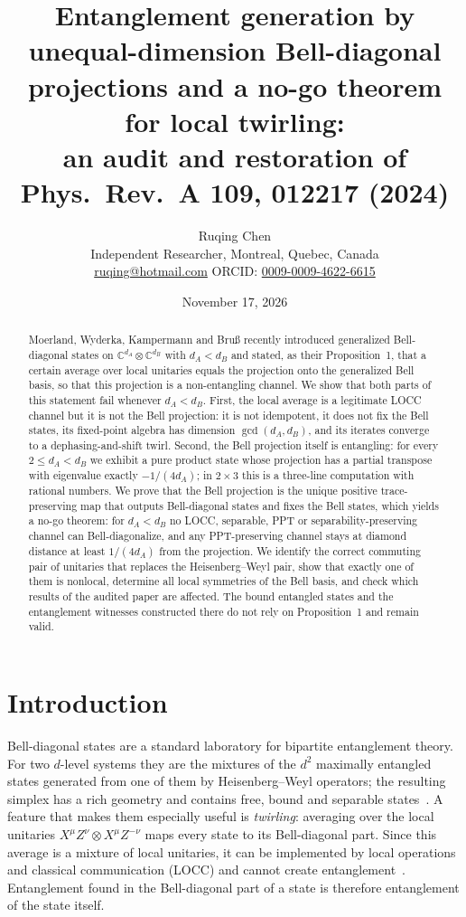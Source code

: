 \documentclass[11pt,a4paper]{article}
\title{Entanglement generation by unequal-dimension Bell-diagonal projections
and a no-go theorem for local twirling:\\
an audit and restoration of Phys.\ Rev.\ A 109, 012217 (2024)}
\author{Ruqing Chen\\[2pt]
\small Independent Researcher, Montreal, Quebec, Canada\\
\small \href{mailto:ruqing@hotmail.com}{ruqing@hotmail.com}\quad
ORCID: \href{https://orcid.org/0009-0009-4622-6615}{0009-0009-4622-6615}}
\date{November 17, 2026}
\theoremstyle{definition}
\theoremstyle{remark}
\newcommand{\dA}{d_A}
\newcommand{\dB}{d_B}
\begin{document}
\maketitle

\begin{abstract}
Moerland, Wyderka, Kampermann and Bru\ss{} recently introduced generalized Bell-diagonal
states on $\mathbb{C}^{\dA}\otimes\mathbb{C}^{\dB}$ with $\dA<\dB$ and stated, as their
Proposition~1, that a certain average over local unitaries equals the projection onto the
generalized Bell basis, so that this projection is a non-entangling channel. We show that
both parts of this statement fail whenever $\dA<\dB$. First, the local average is a
legitimate LOCC channel but it is not the Bell projection: it is not idempotent, it does not
fix the Bell states, its fixed-point algebra has dimension $\gcd(\dA,\dB)$, and its iterates
converge to a dephasing-and-shift twirl. Second, the Bell projection itself is entangling:
for every $2\le\dA<\dB$ we exhibit a pure product state whose projection has a partial
transpose with eigenvalue exactly $-1/(4\dA)$; in $2\times3$ this is a three-line computation
with rational numbers. We prove that the Bell projection is the unique positive
trace-preserving map that outputs Bell-diagonal states and fixes the Bell states, which
yields a no-go theorem: for $\dA<\dB$ no LOCC, separable, PPT or separability-preserving
channel can Bell-diagonalize, and any PPT-preserving channel stays at diamond distance at
least $1/(4\dA)$ from the projection. We identify the correct commuting pair of unitaries
that replaces the Heisenberg--Weyl pair, show that exactly one of them is nonlocal,
determine all local symmetries of the Bell basis, and check which results of the audited
paper are affected. The bound entangled states and the entanglement witnesses constructed
there do not rely on Proposition~1 and remain valid.
\end{abstract}

\section{Introduction}

Bell-diagonal states are a standard laboratory for bipartite entanglement theory. For two
$d$-level systems they are the mixtures of the $d^2$ maximally entangled states generated
from one of them by Heisenberg--Weyl operators; the resulting simplex has a rich geometry
and contains free, bound and separable states~\cite{BHN06,PH24,HHHH09}. A feature that
makes them especially useful is \emph{twirling}: averaging over the local unitaries
$X^\mu Z^\nu\otimes X^\mu Z^{-\nu}$ maps every state to its Bell-diagonal part. Since this
average is a mixture of local unitaries, it can be implemented by local operations and
classical communication (LOCC) and cannot create entanglement~\cite{BDSW96,Werner89}.
Entanglement found in the Bell-diagonal part of a state is therefore entanglement of the
state itself.
\end{document}
